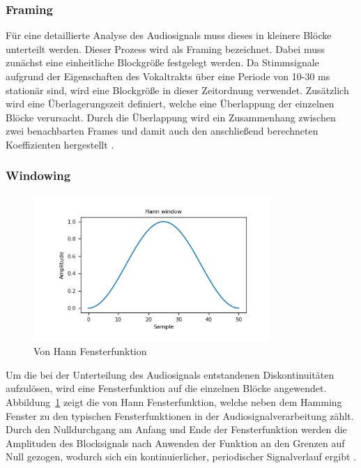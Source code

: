 \subsubsection{Framing}\label{sec:Framing}
Für eine detaillierte Analyse des Audiosignals muss dieses in kleinere Blöcke unterteilt werden.
Dieser Prozess wird als Framing bezeichnet.
Dabei muss zunächst eine einheitliche Blockgröße festgelegt werden.
Da Stimmsignale aufgrund der Eigenschaften des Vokaltrakts über eine Periode von 10-30 ms stationär sind, wird eine Blockgröße in dieser Zeitordnung verwendet.
Zusätzlich wird eine Überlagerungszeit definiert, welche eine Überlappung der einzelnen Blöcke verursacht.
Durch die Überlappung wird ein Zusammenhang zwischen zwei benachbarten Frames und damit auch den anschließend berechneten Koeffizienten hergestellt \autocite[vgl.][S. 457]{richter_signal_2022}.

\subsubsection{Windowing}
\begin{figure}
  \centering
  \includegraphics[width=0.8\textwidth, keepaspectratio]{images/hann_window.png}
  \caption{Von Hann Fensterfunktion \autocite{noauthor_numpyhanning_nodate}}
  \label{fig:vonHannFenster}
\end{figure}
Um die bei der Unterteilung des Audiosignals entstandenen Diskontinuitäten aufzulösen, wird eine Fensterfunktion auf die einzelnen Blöcke angewendet.
Abbildung~\ref{fig:vonHannFenster} zeigt die von Hann Fensterfunktion, welche neben dem Hamming Fenster zu den typischen Fensterfunktionen in der Audiosignalverarbeitung zählt.
Durch den Nulldurchgang am Anfang und Ende der Fensterfunktion werden die Amplituden des Blocksignals nach Anwenden der Funktion an den Grenzen auf Null gezogen, wodurch sich ein kontinuierlicher, periodischer Signalverlauf ergibt \autocite[vgl.][S. 462]{richter_signal_2022}.

